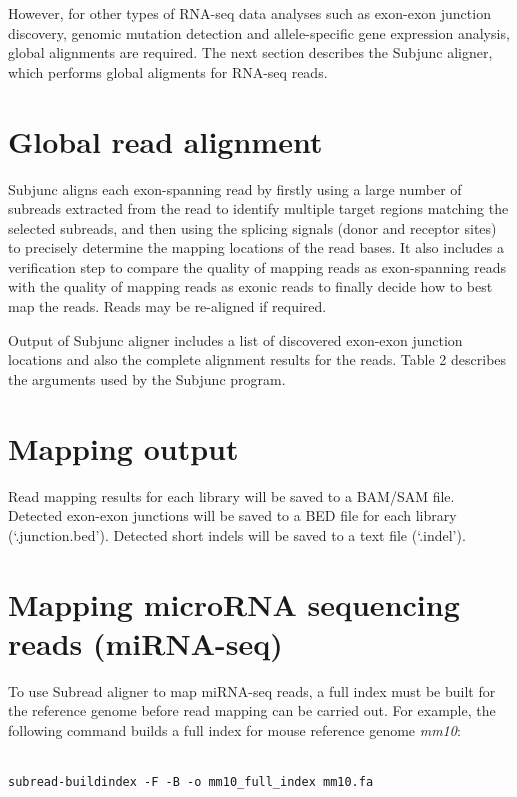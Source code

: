 \documentclass[12pt]{report}
\newcommand{\code}[1]{{\small\texttt{#1}}}
\newcommand{\Subread}{\textsf{Subread}}
\newcommand{\Subjunc}{\textsf{Subjunc}}
\begin{document}
However, for other types of RNA-seq data analyses such as exon-exon junction discovery, genomic mutation detection and allele-specific gene expression analysis, global alignments are required.
The next section describes the {\Subjunc} aligner, which performs global aligments for RNA-seq reads.
 
\section{Global read alignment}

{\Subjunc} aligns each exon-spanning read by firstly using a large number of subreads extracted from the read to identify multiple target regions matching the selected subreads, and then using the splicing signals (donor and receptor sites) to precisely determine the mapping locations of the read bases.
It also includes a verification step to compare the quality of mapping reads as exon-spanning reads with the quality of mapping reads as exonic reads to finally decide how to best map the reads.
Reads may be re-aligned if required.

Output of {\Subjunc} aligner includes a list of discovered exon-exon junction locations and also the complete alignment results for the reads.
Table 2 describes the arguments used by the {\Subjunc} program.\\

\section{Mapping output}

Read mapping results for each library will be saved to a BAM/SAM file.
Detected exon-exon junctions will be saved to a BED file for each library (`.junction.bed').
Detected short indels will be saved to a text file (`.indel').\\



\section{Mapping microRNA sequencing reads (miRNA-seq)}

To use {\Subread} aligner to map miRNA-seq reads, a full index must be built for the reference genome before read mapping can be carried out.
For example, the following command builds a full index for mouse reference genome \emph{mm10}:

\code{\\
subread-buildindex -F -B -o mm10\_full\_index mm10.fa \\
}
\end{document}
